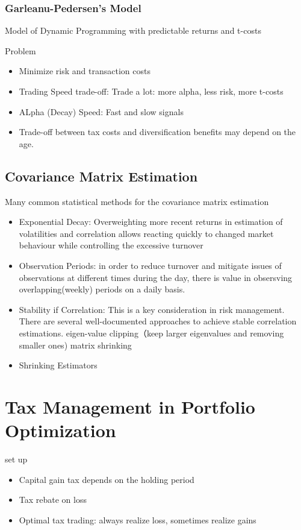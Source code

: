 \documentclass[11pt, openany]{book}              %
\begin{document}
\subsubsection{Garleanu-Pedersen's Model}

Model of Dynamic Programming with predictable returns and t-costs

Problem
\begin{itemize}
	\item Minimize risk and transaction costs
	\item Trading Speed trade-off: Trade a lot: more alpha, less risk, more t-costs 
	\item ALpha (Decay) Speed: Fast and slow signals
	\item Trade-off between tax costs and diversification benefits may depend on the age.
\end{itemize}

\subsection{Covariance Matrix Estimation}

Many common statistical methods for the covariance matrix estimation
\begin{itemize}
	\item Exponential Decay: Overweighting more recent returns in estimation of volatilities and correlation allows reacting quickly to changed market behaviour while controlling the excessive turnover
	\item Observation Periods: in order to reduce turnover and mitigate issues of observations at different times during the day, there is value in obsersving overlapping(weekly) periods on a daily basis. 
	\item Stability if Correlation: This is a key consideration in risk management. There are several well-documented approaches to achieve stable correlation estimations.
		\subitem eigen-value clipping（keep larger eigenvalues and removing smaller ones) 
		\subitem matrix shrinking
	\item Shrinking Estimators
\end{itemize}

\section{Tax Management in Portfolio Optimization}

set up

\begin{itemize}
	\item Capital gain tax depends on the holding period
	\item Tax rebate on loss
	\item Optimal tax trading: always realize loss, sometimes realize gains
\end{itemize}
\end{document}
